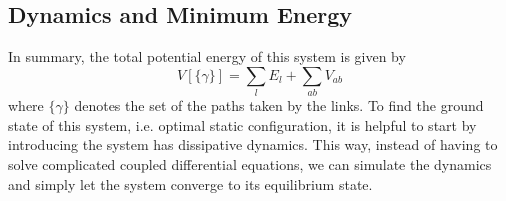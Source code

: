 \documentclass[nofootinbib,preprint,floatfix,titlepage,superscriptaddress]{revtex4} %
\begin{document}
\subsection{Dynamics and Minimum Energy\label{ap:eom}}
In summary, the total potential energy of this system is given by
\begin{equation}
V[\{\gamma\}] = \sum_l E_l + \sum_{ab} V_{ab} \label{eq:V}
\end{equation}
where $\{\gamma\}$ denotes the set of the paths taken by the links. 
To find the ground state of this system, i.e. optimal static configuration, it is helpful to start by introducing the system has dissipative dynamics. This way, instead of having to solve complicated coupled differential equations, we can simulate the dynamics and simply let the system converge to its equilibrium state. 
\end{document}
